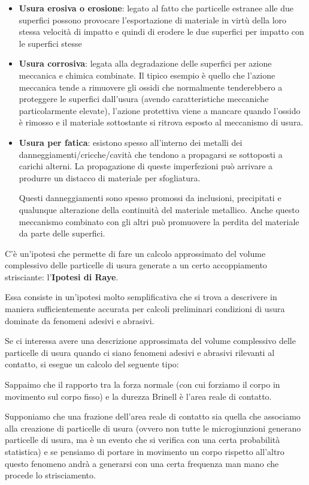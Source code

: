 \begin{itemize}
\item \textbf{Usura erosiva o erosione}: legato al fatto che particelle estranee alle due superfici possono provocare l'esportazione di materiale in virtù della loro stessa velocità di impatto e quindi di erodere le due superfici per impatto con le superfici stesse
\item \textbf{Usura corrosiva}: legata alla degradazione delle superfici per azione meccanica e chimica combinate. Il tipico esempio è quello che l'azione meccanica tende a rimuovere gli ossidi che normalmente tenderebbero a proteggere le superfici dall'usura (avendo caratteristiche meccaniche particolarmente elevate), l'azione protettiva viene a mancare quando l'ossido è rimosso e il materiale sottostante si ritrova esposto al meccanismo di usura.
\item \textbf{Usura per fatica}: esistono spesso all'interno dei metalli dei danneggiamenti/cricche/cavità che tendono a propagarsi se sottoposti a carichi alterni. La propagazione di queste imperfezioni può arrivare a produrre un distacco di materiale per sfogliatura.

Questi danneggiamenti sono spesso promossi da inclusioni, precipitati e qualunque alterazione della continuità del materiale metallico. Anche questo meccanismo combinato con gli altri può promuovere la perdita del materiale da parte delle superfici.
\end{itemize}

C'è un'ipotesi che permette di fare un calcolo approssimato del volume complessivo delle particelle di usura generate a un certo accoppiamento strisciante: l'\textbf{Ipotesi di Raye}.

Essa consiste in un'ipotesi molto semplificativa che si trova a descrivere in maniera sufficientemente accurata per calcoli preliminari condizioni di usura dominate da fenomeni adesivi e abrasivi.

Se ci interessa avere una descrizione approssimata del volume complessivo delle particelle di usura quando ci siano fenomeni adesivi e abrasivi rilevanti al contatto, si esegue un calcolo del seguente tipo:

Sappaimo che il rapporto tra la forza normale (con cui forziamo il corpo in movimento sul corpo fisso) e la durezza Brinell è l'area reale di contatto. 

Supponiamo che una frazione dell'area reale di contatto sia quella che associamo alla creazione di particelle di usura (ovvero non tutte le microgiunzioni generano particelle di usura, ma è un evento che si verifica con una certa probabilità statistica) e se pensiamo di portare in movimento un corpo rispetto all'altro questo fenomeno andrà a generarsi con una certa frequenza man mano che procede lo strisciamento.

